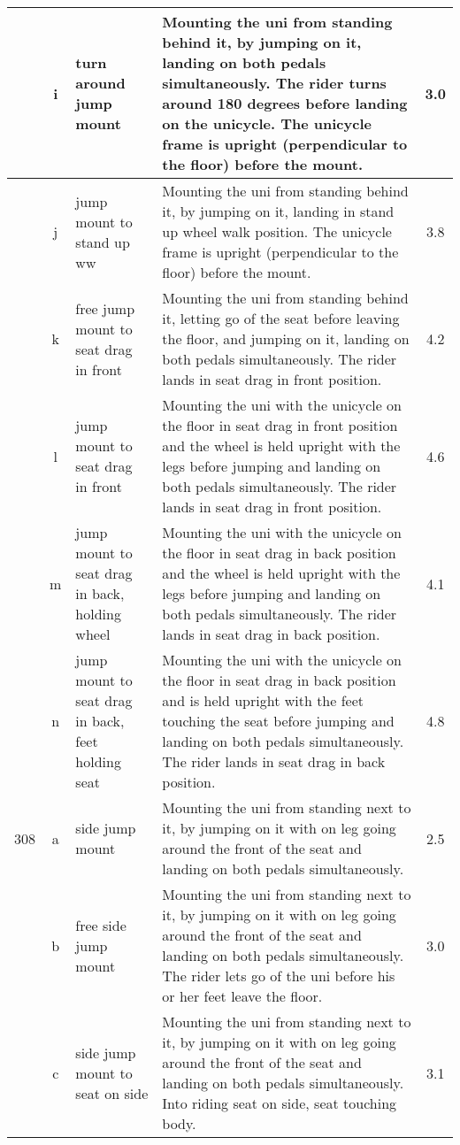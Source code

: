 \begin{longtable}{|r|c|p{4cm}|p{8cm}|c|}
\hline
  & i & turn around jump mount  & Mounting the uni from standing behind it, by jumping on it, landing on both pedals simultaneously. The rider turns around 180 degrees before landing on the unicycle. The unicycle frame is upright (perpendicular to the floor) before the mount.  & 3.0 \\ 
\hline
  & j & jump mount to stand up ww & Mounting the uni from standing behind it, by jumping on it, landing in stand up wheel walk position. The unicycle frame is upright (perpendicular to the floor) before the mount. & 3.8 \\ 
\hline
  & k & free jump mount to seat drag in front & Mounting the uni from standing behind it, letting go of the seat before leaving the floor, and jumping on it, landing on both pedals simultaneously. The rider lands in seat drag in front position.  & 4.2 \\ 
\hline
  & l & jump mount to seat drag in front  & Mounting the uni with the unicycle on the floor in seat drag in front position and the wheel is held upright with the legs before jumping and landing on both pedals simultaneously. The rider lands in seat drag in front position.  & 4.6 \\ 
\hline
  & m & jump mount to seat drag in back, holding wheel  & Mounting the uni with the unicycle on the floor in seat drag in back position and the wheel is held upright with the legs before jumping and landing on both pedals simultaneously. The rider lands in seat drag in back position.  & 4.1 \\ 
\hline
  & n & jump mount to seat drag in back, feet holding seat  & Mounting the uni with the unicycle on the floor in seat drag in back position and is held upright with the feet touching the seat before jumping and landing on both pedals simultaneously. The rider lands in seat drag in back position.  & 4.8 \\ 
\hline
308 & a & side jump mount & Mounting the uni from standing next to it, by jumping on it with on leg going around the front of the seat and landing on both pedals simultaneously. & 2.5 \\ 
\hline
  & b & free side jump mount  & Mounting the uni from standing next to it, by jumping on it with on leg going around the front of the seat and landing on both pedals simultaneously. The rider lets go of the uni before his or her feet leave the floor.  & 3.0 \\ 
\hline
  & c & side jump mount to seat on side & Mounting the uni from standing next to it, by jumping on it with on leg going around the front of the seat and landing on both pedals simultaneously. Into riding seat on side, seat touching body. & 3.1 \\ 

\end{longtable}
